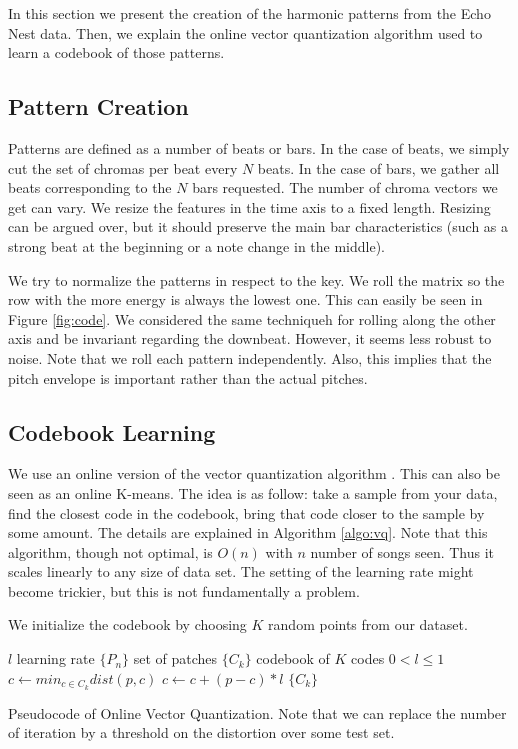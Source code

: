 \documentclass{article}
\begin{document}
In this section we present the creation of the harmonic patterns from
the Echo Nest data. Then, we explain the online vector quantization algorithm
used to learn a codebook of those patterns.

\subsection{Pattern Creation}
Patterns are defined as a number of beats or bars. In the case of beats,
we simply cut the set of chromas per beat every $N$ beats. In the case
of bars, we gather all beats corresponding to the $N$ bars requested.
The number of chroma vectors we get can vary. We resize the features in the
time axis to a fixed length. Resizing can be argued over, but it should
preserve the main bar characteristics (such as a strong beat at the beginning
or a note change in the middle).

We try to normalize the patterns in respect to the key. We roll the matrix
so the row with the more energy is always the lowest one. This can easily be
seen in Figure \ref{fig:code}. We considered the same techniqueh for rolling
along the other axis and be invariant regarding the downbeat. However, it
seems less robust to noise. Note that we roll each pattern independently.
Also, this implies that the pitch envelope is important rather than the actual 
pitches.


\subsection{Codebook Learning}
We use an online version of the vector quantization algorithm 
\cite{Gersho1991}. This can also be seen as an online K-means.
The idea is as follow: take a sample from your data, find the closest
code in the codebook, bring that code closer to the sample by some amount.
The details are explained in Algorithm \ref{algo:vq}. Note that this
algorithm, though not optimal, is $O(n)$ with $n$ number of songs seen.
Thus it scales linearly to any size of data set. The setting of the learning
rate might become trickier, but this is not fundamentally a problem.

We initialize the codebook by choosing $K$ random points from our dataset.


\begin{algorithm}
\begin{algorithmic}
\STATE$l$ learning rate
\STATE$\{P_n\}$ set of patches
\STATE$\{C_k\}$ codebook of $K$ codes
\REQUIRE $0 < l \leq 1$
\STATE$c \leftarrow min_{c \in C_k} dist(p,c)$
\STATE$c \leftarrow c + (p - c) * l$
\ENDFOR
\ENDFOR
\RETURN $\{C_k\}$
\caption{\small{Pseudocode of Online Vector Quantization. Note that we can 
replace the number of iteration by a threshold on the distortion over some 
test set.}
\label{algo:vq}}
\end{algorithmic}
\end{algorithm}
\end{document}
